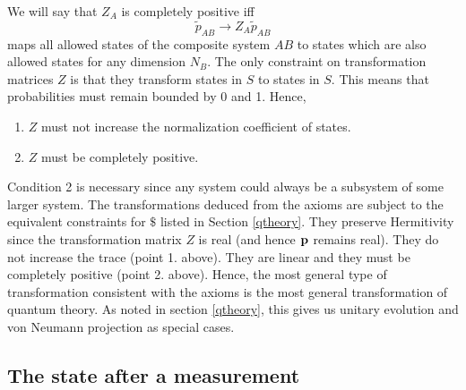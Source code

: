 \documentclass[12pt]{article}
\begin{document}
We will say that $Z_A$ is completely positive iff
\begin{equation}\label{ZPZ}
\tilde{p}_{AB} \rightarrow Z_A \tilde{p}_{AB}
\end{equation}
maps all allowed states of the composite system $AB$ to states
which are also allowed states for any dimension $N_B$.
The only constraint on transformation matrices $Z$ is that they
transform states in $S$ to states in $S$.  This means that probabilities
must remain bounded by 0 and 1.  Hence,
\begin{enumerate}
\item $Z$ must not increase the normalization coefficient of states.
\item $Z$ must be completely positive.
\end{enumerate}
Condition 2 is necessary since any system could always be a subsystem of
some larger system. The transformations deduced from the axioms are
subject to the equivalent constraints for $\$ $ listed in Section
\ref{qtheory}.  They preserve Hermitivity since the transformation
matrix $Z$ is real (and hence ${\bf p}$ remains real).
They do not increase the trace (point 1. above).
They are linear and they must be completely positive (point 2. above).
Hence, the most general type of transformation consistent with the
axioms is the most general transformation of quantum theory.  As noted
in section \ref{qtheory}, this gives us unitary evolution and von
Neumann projection as special cases.

\subsection{The state after a measurement}
\end{document}
